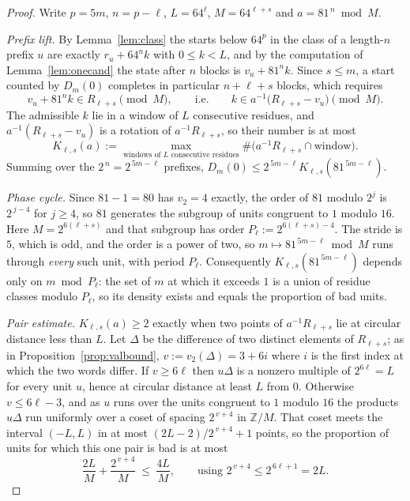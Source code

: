 \documentclass[11pt,a4paper]{article}
\theoremstyle{plain}
\theoremstyle{definition}
\theoremstyle{remark}
\begin{document}
\begin{proof}
Write $p=5m$, $n=p-\ell$, $L=64^{\ell}$, $M=64^{\ell+s}$ and $a=81^{\,n}\bmod M$.

\emph{Prefix lift.} By Lemma~\ref{lem:class} the starts below $64^{p}$ in the
class of a length-$n$ prefix $u$ are exactly $r_u+64^{n}k$ with $0\le k<L$, and
by the computation of Lemma~\ref{lem:onecand} the state after $n$ blocks is
$v_u+81^{n}k$. Since $s\le m$, a start counted by $D_m(0)$ completes in
particular $n+\ell+s$ blocks, which requires
\[
v_u+81^{n}k\in R_{\ell+s}\pmod M,\qquad\text{i.e.}\qquad
k\in a^{-1}\bigl(R_{\ell+s}-v_u\bigr)\pmod M .
\]
The admissible $k$ lie in a window of $L$ consecutive residues, and
$a^{-1}(R_{\ell+s}-v_u)$ is a rotation of $a^{-1}R_{\ell+s}$, so their number is
at most
\[
K_{\ell,s}(a):=\max_{\text{windows of }L\text{ consecutive residues}}
\#\bigl(a^{-1}R_{\ell+s}\cap\text{window}\bigr).
\]
Summing over the $2^{\,n}=2^{\,5m-\ell}$ prefixes,
$D_m(0)\le 2^{\,5m-\ell}K_{\ell,s}(81^{\,5m-\ell})$.

\emph{Phase cycle.} Since $81-1=80$ has $v_2=4$ exactly, the order of $81$
modulo $2^{j}$ is $2^{\,j-4}$ for $j\ge4$, so $81$ generates the subgroup of
units congruent to $1$ modulo $16$. Here $M=2^{6(\ell+s)}$ and that subgroup
has order $P_\ell:=2^{6(\ell+s)-4}$. The stride is $5$, which is odd, and the
order is a power of two, so $m\mapsto 81^{\,5m-\ell}\bmod M$ runs through
\emph{every} such unit, with period $P_\ell$. Consequently
$K_{\ell,s}(81^{\,5m-\ell})$ depends only on $m\bmod P_\ell$: the set of $m$ at
which it exceeds $1$ is a union of residue classes modulo $P_\ell$, so its
density exists and equals the proportion of bad units.

\emph{Pair estimate.} $K_{\ell,s}(a)\ge2$ exactly when two points of
$a^{-1}R_{\ell+s}$ lie at circular distance less than $L$. Let $\Delta$ be the
difference of two distinct elements of $R_{\ell+s}$; as in
Proposition~\ref{prop:valbound}, $v:=v_2(\Delta)=3+6i$ where $i$ is the first
index at which the two words differ. If $v\ge6\ell$ then $u\Delta$ is a nonzero
multiple of $2^{6\ell}=L$ for every unit $u$, hence at circular distance at
least $L$ from $0$. Otherwise $v\le6\ell-3$, and as $u$ runs over the units
congruent to $1$ modulo $16$ the products $u\Delta$ run uniformly over a coset
of spacing $2^{\,v+4}$ in $\mathbb{Z}/M$. That coset meets the interval
$(-L,L)$ in at most $(2L-2)/2^{\,v+4}+1$ points, so the proportion of units for
which this one pair is bad is at most
\[
\frac{2L}{M}+\frac{2^{\,v+4}}{M}\ \le\ \frac{4L}{M},
\qquad\text{using } 2^{\,v+4}\le 2^{\,6\ell+1}=2L .
\]


\end{proof}
\end{document}
